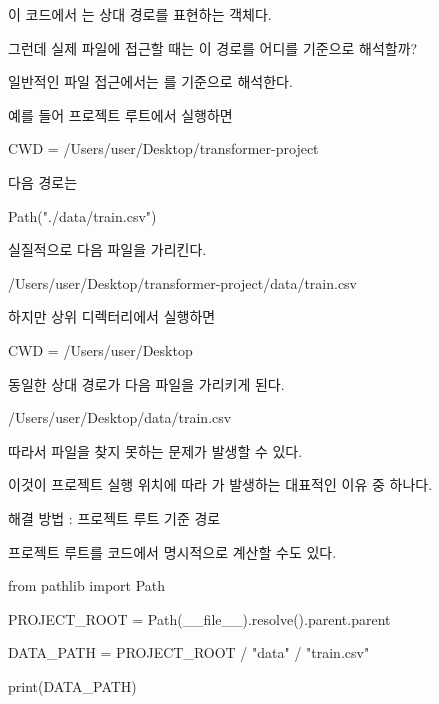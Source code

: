 이 코드에서 는 상대 경로를 표현하는  객체다.

그런데 실제 파일에 접근할 때는 이 경로를 어디를 기준으로 해석할까?

일반적인 파일 접근에서는 를 기준으로 해석한다.

예를 들어 프로젝트 루트에서 실행하면

\begin{dhkzsh}
CWD = /Users/user/Desktop/transformer-project
\end{dhkzsh}

다음 경로는

\begin{dhkcode}
Path("./data/train.csv")
\end{dhkcode}

실질적으로 다음 파일을 가리킨다.

\begin{dhkzsh}
/Users/user/Desktop/transformer-project/data/train.csv
\end{dhkzsh}

하지만 상위 디렉터리에서 실행하면

\begin{dhkzsh}
CWD = /Users/user/Desktop
\end{dhkzsh}

동일한 상대 경로가 다음 파일을 가리키게 된다.

\begin{dhkzsh}
/Users/user/Desktop/data/train.csv
\end{dhkzsh}

따라서 파일을 찾지 못하는 문제가 발생할 수 있다.

이것이 프로젝트 실행 위치에 따라 가 발생하는 대표적인 이유 중 하나다.

\begin{dhknote}
\begin{dhksmry}[centered]
해결 방법 : 프로젝트 루트 기준 경로
\end{dhksmry}
\end{dhknote}

프로젝트 루트를 코드에서 명시적으로 계산할 수도 있다.

\begin{dhkcode}
from pathlib import Path

PROJECT_ROOT = Path(__file__).resolve().parent.parent

DATA_PATH = PROJECT_ROOT / "data" / "train.csv"

print(DATA_PATH)
\end{dhkcode}

